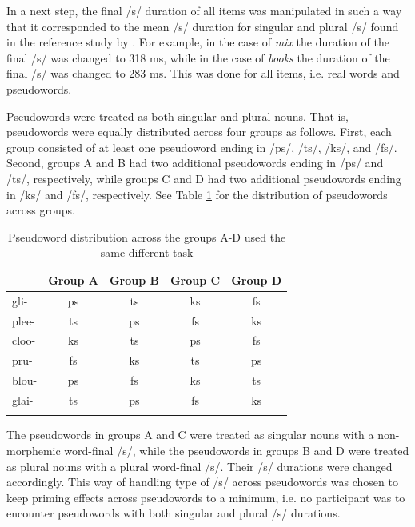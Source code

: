 In a next step, the final /s/ duration of all items was manipulated in such a way that it corresponded to the mean /s/ duration for singular and plural /s/ found in the reference study by \citet{Plag2017}. For example, in the case of \textit{mix} the duration of the final /s/ was changed to 318 ms, while in the case of \textit{books} the duration of the final /s/ was changed to 283 ms. This was done for all items, i.e. real words and pseudowords. 

Pseudowords were treated as both singular and plural nouns. That is, pseudowords were equally distributed across four groups as follows. First, each group consisted of at least one pseudoword ending in /ps/, /ts/, /ks/, and /fs/. Second, groups A and B had two additional pseudowords ending in /ps/ and /ts/, respectively, while groups C and D had two additional pseudowords ending in /ks/ and /fs/, respectively. See Table \ref{tab:6.5} for the distribution of pseudowords across groups. 

\begin{table}\fontsize{10}{11}
\caption{Pseudoword distribution across the groups A-D used the same-different task}
\label{tab:6.5}
\centering
\begin{tabular}{lcccc} 
\lsptoprule
~     & Group A & Group B & Group C & Group D  \\ 
\midrule
gli-  & ps      & ts      & ks      & fs       \\
plee- & ts      & ps      & fs      & ks       \\
cloo- & ks      & ts      & ps      & fs       \\
pru-  & fs      & ks      & ts      & ps       \\
blou- & ps      & fs      & ks      & ts       \\
glai- & ts      & ps      & fs      & ks       \\
\lspbottomrule
\end{tabular}
\end{table}

The pseudowords in groups A and C were treated as singular nouns with a non-morphemic word-final /s/, while the pseudowords in groups B and D were treated as plural nouns with a plural word-final /s/. Their /s/ durations were changed accordingly. This way of handling type of /s/ across pseudowords was chosen to keep priming effects across pseudowords to a minimum, i.e. no participant was to encounter pseudowords with both singular and plural /s/ durations. 

